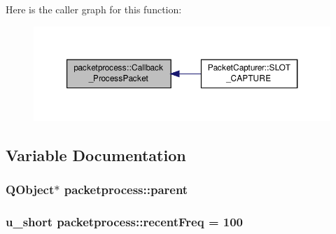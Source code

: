 Here is the caller graph for this function\-:\nopagebreak
\begin{figure}[H]
\begin{center}
\leavevmode
\includegraphics[width=350pt]{namespacepacketprocess_a17240af943c2d732bb5242e802445a5f_icgraph}
\end{center}
\end{figure}




\subsection{Variable Documentation}
\hypertarget{namespacepacketprocess_ad98eea621960299d54ed1535bf3a605e}{
\subsubsection[{parent}]{\setlength{\rightskip}{0pt plus 5cm}Q\-Object$\ast$ packetprocess\-::parent}}\label{namespacepacketprocess_ad98eea621960299d54ed1535bf3a605e}
\hypertarget{namespacepacketprocess_a0ffda1e178a79656e927189b103e8708}{
\subsubsection[{recent\-Freq}]{\setlength{\rightskip}{0pt plus 5cm}u\-\_\-short packetprocess\-::recent\-Freq = 100}}\label{namespacepacketprocess_a0ffda1e178a79656e927189b103e8708}
